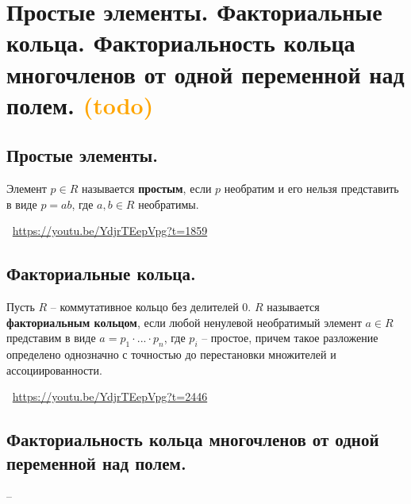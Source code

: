 \section{Простые элементы. Факториальные кольца. Факториальность кольца многочленов от одной переменной над полем. \textcolor{orange}{(todo)}}

\subsection{Простые элементы.}
\begin{definition}
    Элемент $p \in R$ называется \textbf{простым}, если $p$ необратим и его нельзя представить в виде $p = ab$, где $a, b \in R$ необратимы.
\end{definition}
\large \faYoutube \normalsize $\>$ \url{https://youtu.be/YdjrTEepVpg?t=1859}

\subsection{Факториальные кольца.}
\begin{definition}
    Пусть $R$ -- коммутативное кольцо без делителей 0. $R$ называется \textbf{факториальным кольцом}, если любой ненулевой необратимый элемент $a \in R$ представим в виде $a = p_1 \cdot ... \cdot p_n$, где $p_i$ -- простое, причем такое разложение определено однозначно с точностью до перестановки множителей и ассоциированности.
\end{definition}
\large \faYoutube \normalsize $\>$ \url{https://youtu.be/YdjrTEepVpg?t=2446}

\subsection{Факториальность кольца многочленов от одной переменной над полем.}
--
\large \faYoutube \normalsize $\>$ \url{}